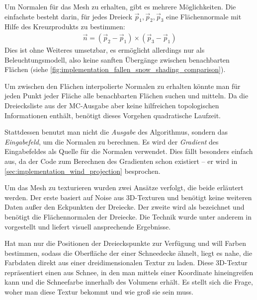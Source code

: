 Um Normalen für das Mesh zu erhalten, gibt es mehrere
Möglichkeiten. Die einfachste besteht darin, für jedes Dreieck
$\vec{p}_1,\vec{p}_2,\vec{p}_3$ eine Flächennormale mit Hilfe des Kreuzprodukts zu bestimmen:
\begin{align}
\vec{n} = (\vec{p}_2 - \vec{p}_1) \times (\vec{p}_3 - \vec{p}_1)
\end{align}
Dies ist ohne Weiteres umsetzbar, es ermöglicht allerdings nur
 als Beleuchtungsmodell, also keine
sanften Übergänge zwischen benachbarten Flächen (siehe
\autoref{fig:implementation_fallen_snow_shading_comparison}).

Um zwischen den Flächen interpolierte Normalen zu erhalten könnte man
für jeden Punkt jeder Fläche alle benachbarten Flächen suchen und
mitteln. Da die Dreiecksliste aus der MC-Ausgabe aber keine
hilfreichen topologischen Informationen enthält, benötigt dieses
Vorgehen quadratische Laufzeit.

Stattdessen benutzt man nicht die \emph{Ausgabe} des Algorithmus,
sondern das \emph{Eingabefeld}, um die Normalen zu berechnen. Es wird
der \emph{Gradient} des Eingabefeldes als Quelle für die Normalen
verwendet. Dies fällt besonders einfach aus, da der Code zum Berechnen
des Gradienten schon existiert -- er wird in
\autoref{sec:implementation_wind_projection} besprochen.

Um das Mesh zu texturieren wurden zwei Ansätze verfolgt, die beide
erläutert werden. Der erste basiert auf Noise aus 3D-Texturen und
benötigt keine weiteren Daten außer den Eckpunkten der Dreiecke. Der
zweite wird als  bezeichnet
und benötigt die Flächennormalen der Dreiecke. Die Technik wurde unter
anderem in \cite{Nguyen:2007:GG:1407436} vorgestellt und liefert
visuell ansprechende Ergebnisse.

Hat man nur die Positionen der Dreieckspunkte zur Verfügung und will
Farben bestimmen, sodass die Oberfläche der einer Schneedecke ähnelt,
liegt es nahe, die Farbdaten direkt aus einer dreidimensionalen Textur
zu laden. Diese 3D-Textur repräsentiert einen 
aus Schnee, in den man mittels einer Koordinate hineingreifen kann und
die Schneefarbe innerhalb des Volumens erhält. Es stellt sich die
Frage, woher man diese Textur bekommt und wie groß sie sein muss.

